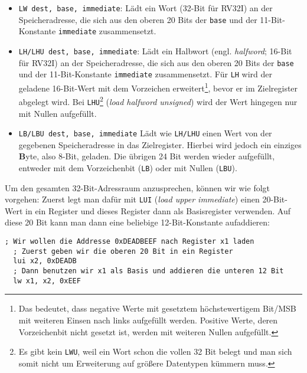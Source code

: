 \begin{itemize}
  \item \lstinline[style=risc-v_Assembler]!LW dest, base, immediate!: Lädt ein Wort (32-Bit für RV32I) an der
    Speicheradresse, die sich aus den oberen 20 Bits der \lstinline[style=risc-v_Assembler]!base! und der
    11-Bit-Konstante \lstinline[style=risc-v_Assembler]!immediate! zusammensetzt.
  \item\lstinline[style=risc-v_Assembler]!LH/LHU dest, base, immediate!: Lädt ein Halbwort
    (engl. \emph{halfword}; 16-Bit für RV32I) an der Speicheradresse, die sich
    aus den oberen 20 Bits der \lstinline[style=risc-v_Assembler]!base! und der 11-Bit-Konstante
    \lstinline[style=risc-v_Assembler]!immediate! zusammensetzt. Für \lstinline[style=risc-v_Assembler]!LH! wird der geladene 16-Bit-Wert
    mit dem Vorzeichen erweitert\footnote{Das bedeutet, dass negative Werte mit gesetztem höchstewertigem Bit/MSB
      mit weiteren Einsen nach links aufgefüllt werden. Positive Werte, deren
      Vorzeichenbit nicht gesetzt ist, werden mit weiteren Nullen aufgefüllt.}, bevor er im
    Zielregister abgelegt wird. Bei \lstinline[style=risc-v_Assembler]!LHU!\footnote{Es gibt kein \lstinline[style=risc-v_Assembler]!LWU!,
      weil ein Wort schon die vollen 32 Bit belegt und man sich somit nicht um
      Erweiterung auf größere Datentypen kümmern muss.} (\emph{load halfword
      unsigned}) wird der Wert hingegen nur mit Nullen aufgefüllt.
  \item \lstinline[style=risc-v_Assembler]!LB/LBU dest, base, immediate! Lädt wie \lstinline[style=risc-v_Assembler]!LH/LHU! einen Wert von
    der gegebenen Speicheradresse in das Zielregister. Hierbei wird jedoch ein
    einziges \textbf{B}yte, also 8-Bit, geladen. Die übrigen 24 Bit werden wieder
    aufgefüllt, entweder mit dem Vorzeichenbit (\lstinline[style=risc-v_Assembler]!LB!) oder mit Nullen
    (\lstinline[style=risc-v_Assembler]!LBU!).
\end{itemize}

Um den gesamten 32-Bit-Adressraum anzusprechen, können wir wie folgt vorgehen:
Zuerst legt man dafür mit \lstinline[style=risc-v_Assembler]!LUI! (\emph{load upper immediate}) einen 20-Bit-Wert
in ein Register und dieses Register dann als Basisregister
verwenden. Auf diese 20 Bit kann man dann eine beliebige 12-Bit-Konstante
aufaddieren:

\begin{lstlisting}[style=risc-v_Assembler]
  ; Wir wollen die Addresse 0xDEADBEEF nach Register x1 laden
  ; Zuerst geben wir die oberen 20 Bit in ein Register
  lui x2, 0xDEADB
  ; Dann benutzen wir x1 als Basis und addieren die unteren 12 Bit
  lw x1, x2, 0xEEF
\end{lstlisting}

